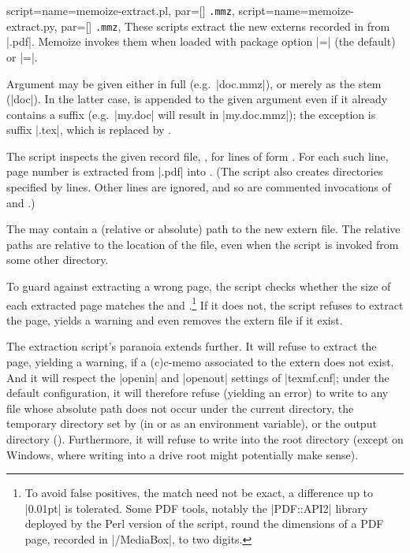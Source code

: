 \documentclass[a4paper,11pt]{article}
\begin{document}
\begin{doc}{
    script={name=memoize-extract.pl, par=[] \texttt{.mmz}},
    script={name=memoize-extract.py, par=[] \texttt{.mmz}},
  }
  These scripts extract the new externs recorded in \dmmz from
  |.pdf|.  Memoize invokes them when loaded with package option
  |=| (the default) or
  |=|.

  Argument \dmmz may be given either in full (e.g.\ |doc.mmz|), or
  merely as the stem (|doc|).  In the latter case, \dmmz is appended to the
  given argument even if it already contains a suffix (e.g.\ |my.doc| will
  result in |my.doc.mmz|); the exception is suffix |.tex|, which is replaced by
  \dmmz.
  
  The script inspects the given record file, \dmmz, for lines of
  form .  For each such line, page number  is extracted from |.pdf| into .
  (The script also creates directories specified by  lines.
  Other lines are ignored, and so are commented invocations of
   and .)

  The  may contain a (relative or absolute) path to the
  new extern file.  The relative paths are relative to the location of the
  \dmmz file, even when the script is invoked from some other directory.

  To guard against extracting a wrong page, the script checks whether the size
  of each extracted page matches the  and .\footnote{\label{fn:tolerance}To avoid false positives, the match
    need not be exact, a difference up to |0.01pt| is tolerated.  Some PDF
    tools, notably the |PDF::API2| library deployed by the Perl version of the
    script, round the dimensions of a PDF page, recorded in |/MediaBox|, to two
    digits.}  If it does not, the script refuses to extract the page, yields a
  warning and even removes the extern file if it exist.

  The extraction script's paranoia extends further.  It will refuse to extract
  the page, yielding a warning, if a (c)c-memo associated to the extern does
  not exist.  And it will respect the |openin| and |openout| settings of
  |texmf.cnf|; under the default configuration, it will therefore refuse
  (yielding an error) to write to any file whose absolute path does not occur
  under the current directory, the temporary directory set by
   (in  or as an environment variable),
  or the output directory ().  Furthermore, it
  will refuse to write into the root directory (except on Windows, where
  writing into a drive root might potentially make sense).


\end{doc}
\end{document}
